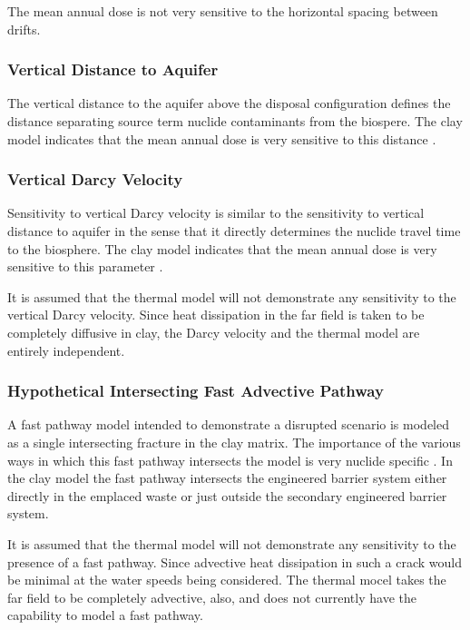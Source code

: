 The mean annual dose is not very sensitive to the horizontal spacing between 
drifts. 

\subsubsection{Vertical Distance to Aquifer}

The vertical distance to the aquifer above the disposal configuration defines 
the distance separating source term nuclide contaminants from the biospere. The 
clay model indicates that the mean annual dose is very sensitive to this 
distance \cite{nutt_generic_2011}.

\subsubsection{Vertical Darcy Velocity}

Sensitivity to vertical Darcy velocity is similar to the sensitivity to vertical 
distance to aquifer in the sense that it directly determines the nuclide travel 
time to the biosphere. The clay model indicates that the mean annual dose is 
very sensitive to this parameter \cite{nutt_generic_2011}.

It is assumed that the thermal model will not demonstrate any
sensitivity to the vertical Darcy velocity. Since heat dissipation in the far 
field is taken to be completely diffusive in clay, the Darcy velocity and the 
thermal model are entirely independent.

\subsubsection{Hypothetical Intersecting Fast Advective Pathway}

A fast pathway model intended to demonstrate a disrupted scenario is modeled as 
a single intersecting fracture in the clay matrix. The importance of the various 
ways in which this fast pathway intersects the model is very nuclide specific 
\cite{nutt_generic_2011}. In the clay model the fast pathway intersects the 
engineered barrier system either directly in the emplaced waste or just outside 
the secondary engineered barrier system.

It is assumed that the thermal model will not demonstrate any
sensitivity to the presence of a fast pathway. Since advective heat dissipation 
in such a crack would be minimal at the water speeds being considered. The 
thermal mocel takes the far field to be completely advective, also, and does not 
currently have the capability to model a fast pathway.

